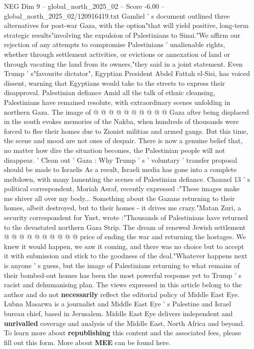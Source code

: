 \begin{textsample}{NEG Dim 9 – global\_north\_2025\_02 – Score -6.00 – global\_north\_2025\_02/120916419.txt}
Gamliel ' s document outlined three alternatives for post-war Gaza, with the option"that will yield positive, long-term strategic results"involving the expulsion of Palestinians to Sinai."We affirm our rejection of any attempts to compromise Palestinians ' unalienable rights, whether through settlement activities, or evictions or annexation of land or through vacating the land from its owners,"they said in a joint statement.
Even Trump ' s"favourite dictator", Egyptian President Abdel Fattah el-Sisi, has voiced dissent, warning that Egyptians would take to the streets to express their disapproval.
Palestinian defiance Amid all the talk of ethnic cleansing, Palestinians have remained resolute, with extraordinary scenes unfolding in northern Gaza.
The image of @ @ @ @ @ @ @ @ @ @ Gaza after being displaced in the south evokes memories of the Nakba, when hundreds of thousands were forced to flee their homes due to Zionist militias and armed gangs.
But this time, the scene and mood are not ones of despair.
There is now a genuine belief that, no matter how dire the situation becomes, the Palestinian people will not disappear. ' Clean out ' Gaza : Why Trump ' s ' voluntary ' transfer proposal should be made to Israelis As a result, Israeli media has gone into a complete meltdown, with many lamenting the scenes of Palestinian defiance.
Channel 13 ' s political correspondent, Moriah Asraf, recently expressed :"These images make me shiver all over my body...
Something about the Gazans returning to their homes, albeit destroyed, but to their homes - it drives me crazy."Matan Zuri, a security correspondent for Ynet, wrote :"Thousands of Palestinians have returned to the devastated northern Gaza Strip.
The dream of renewed Jewish settlement @ @ @ @ @ @ @ @ @ @ price of ending the war and returning the hostages.
We knew it would happen, we saw it coming, and there was no choice but to accept it with submission and stick to the goodness of the deal."Whatever happens next is anyone ' s guess, but the image of Palestinians returning to what remains of their bombed-out homes has been the most powerful response yet to Trump ' s racist and dehumanising plan.
The views expressed in this article belong to the author and do not \textbf{necessarily} reflect the editorial policy of Middle East Eye.
Lubna Masarwa is a journalist and Middle East Eye ' s Palestine and Israel bureau chief, based in Jerusalem.
Middle East Eye delivers independent and \textbf{unrivalled} coverage and analysis of the Middle East, North Africa and beyond.
To learn more about \textbf{republishing} this content and the associated fees, please fill out this form.
More about \textbf{MEE} can be found here.

\end{textsample}
